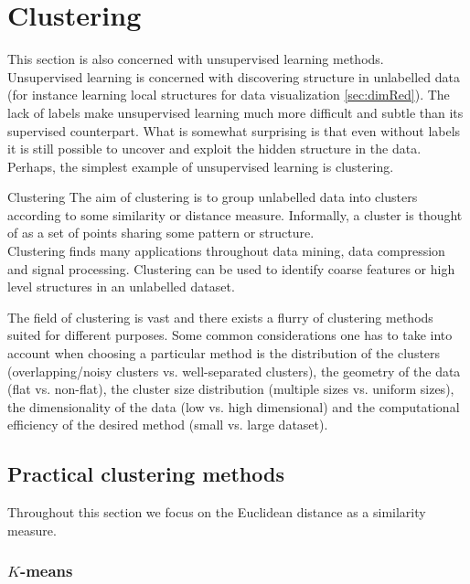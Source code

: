 \section{Clustering}
\label{sec:cluster}
This section is also concerned with unsupervised learning methods.\\
Unsupervised learning is concerned with discovering structure in unlabelled data (for instance learning local structures for data visualization \ref{sec:dimRed}). The lack of labels make unsupervised learning much more difficult and subtle than its supervised counterpart. What is somewhat surprising is that even without labels it is still possible to uncover and exploit the hidden structure in the data. Perhaps, the simplest example of unsupervised learning is clustering.
\begin{mybox}{Clustering}
 The aim of clustering is to group unlabelled data into clusters according to some similarity or distance measure. Informally, a cluster is thought of as a set of points sharing some pattern or structure.\\
 Clustering finds many applications throughout data mining, data compression and signal processing. Clustering can be used to identify coarse features or high level structures in an unlabelled dataset.
\end{mybox}
The field of clustering is vast and there exists a flurry of clustering methods suited for different purposes. Some common considerations one has to take into account when choosing a particular method is the distribution of the clusters (overlapping/noisy clusters vs. well-separated clusters), the geometry of the data (flat vs. non-flat), the cluster size distribution (multiple sizes vs. uniform sizes), the dimensionality of the data (low vs. high dimensional) and the computational efficiency of the desired method (small vs. large dataset).


\subsection{Practical clustering methods}
\label{subsec:clusterPractical}
Throughout this section we focus on the Euclidean distance as a similarity measure.

\subsubsection{$K$-means}
\label{subsubsec:clusterPracticalKmeans}

